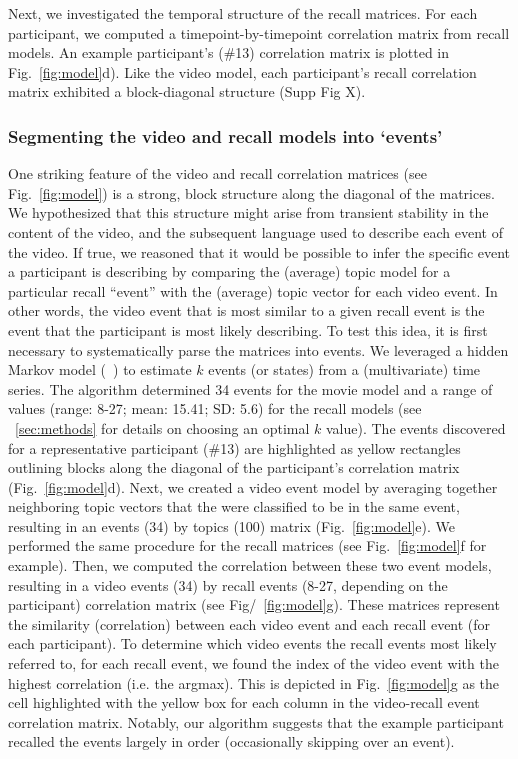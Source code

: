 \documentclass{article}
\begin{document}
{Next, we investigated the temporal structure of the recall matrices. For each participant, we computed a timepoint-by-timepoint correlation matrix from recall models. An example participant's (\#13) correlation matrix is plotted in Fig.~\ref{fig:model}d). Like the video model, each participant's recall correlation matrix exhibited a block-diagonal structure (Supp Fig X).

\subsubsection{Segmenting the video and recall models into `events'}
One striking feature of the video and recall correlation matrices (see Fig.~\ref{fig:model}) is a strong, block structure along the diagonal of the matrices.  We hypothesized that this structure might arise from transient stability in the content of the video, and the subsequent language used to describe each event of the video. If true, we reasoned that it would be possible to infer the specific event a participant is describing by comparing the (average) topic model for a particular recall ``event'' with the (average) topic vector for each video event. In other words, the video event that is most similar to a given recall event is the event that the participant is most likely describing.  To test this idea, it is first necessary to systematically parse the matrices into events.  We leveraged a hidden Markov model (~\citep{BaldEtal17}) to estimate $k$ events (or states) from a (multivariate) time series. The algorithm determined 34 events for the movie model and a range of values (range: 8-27; mean: 15.41; SD: 5.6) for the recall models (see ~\ref{sec:methods} for details on choosing an optimal $k$ value).  The events discovered for a representative participant (\#13) are highlighted as yellow rectangles outlining blocks along the diagonal of the participant's correlation matrix (Fig.~\ref{fig:model}d). Next, we created a video event model by averaging together neighboring topic vectors that the were classified to be in the same event, resulting in an events (34) by topics (100) matrix (Fig.~\ref{fig:model}e).  We performed the same procedure for the recall matrices (see Fig.~\ref{fig:model}f for example). Then, we computed the correlation between these two event models, resulting in a video events (34) by recall events (8-27, depending on the participant) correlation matrix (see Fig/~\ref{fig:model}g). These matrices represent the similarity (correlation) between each video event and each recall event (for each participant). To determine which video events the recall events most likely referred to, for each recall event, we found the index of the video event with the highest correlation (i.e. the argmax).  This is depicted in Fig.~\ref{fig:model}g as the cell highlighted with the yellow box for each column in the video-recall event correlation matrix. Notably, our algorithm suggests that the example participant recalled the events largely in order (occasionally skipping over an event).

}
\end{document}
